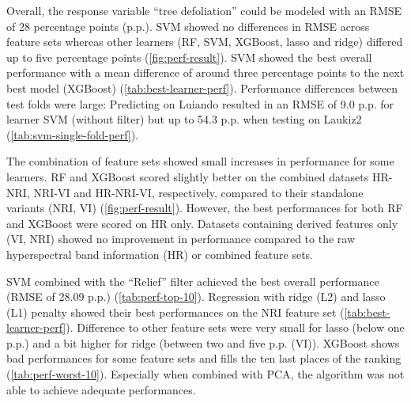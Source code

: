 \documentclass[peerreview]{IEEEtran}
\begin{document}
Overall, the response variable \enquote{tree defoliation} could be modeled with an \ac{RMSE} of 28 percentage points (p.p.).
SVM showed no differences in RMSE across feature sets whereas other learners (RF, SVM, XGBoost, lasso and ridge) differed up to five percentage points (\autoref{fig:perf-result}).
SVM showed the best overall performance with a mean difference of around three percentage points to the next best model (XGBoost) (\autoref{tab:best-learner-perf}).
Performance differences between test folds were large: Predicting on Luiando resulted in an RMSE of 9.0 p.p. for learner SVM (without filter) but up to 54.3 p.p. when testing on Laukiz2 (\autoref{tab:svm-single-fold-perf}).

The combination of feature sets showed small increases in performance for some learners.
RF and XGBoost scored slightly better on the combined datasets HR-NRI, NRI-VI and HR-NRI-VI, respectively, compared to their standalone variants (NRI, VI) (\autoref{fig:perf-result}).
However, the best performances for both RF and XGBoost were scored on HR only.
Datasets containing derived features only (VI, NRI) showed no improvement in performance compared to the raw hyperspectral band information (HR) or combined feature sets.

SVM combined with the \enquote{Relief} filter achieved the best overall performance (RMSE of 28.09 p.p.) (\autoref{tab:perf-top-10}).
Regression with ridge (L2) and lasso (L1) penalty showed their best performances on the NRI feature set (\autoref{tab:best-learner-perf}).
Difference to other feature sets were very small for lasso (below one p.p.) and a bit higher for ridge (between two and five p.p. (VI)).
XGBoost shows bad performances for some feature sets and fills the ten last places of the ranking (\autoref{tab:perf-worst-10}).
Especially when combined with PCA, the algorithm was not able to achieve adequate performances.
\end{document}
